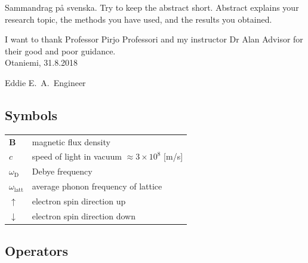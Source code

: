 \documentclass[english, 12pt, a4paper, elec, utf8, a-1b, online]{aaltothesis}
\begin{document}
\newpage

%
\begin{abstractpage}[swedish]
 Sammandrag p\aa{} svenska.
 Try to keep the abstract short. Abstract explains your research topic, 
 the methods you have used, and the results you obtained.  
\end{abstractpage}

I want to thank Professor Pirjo Professori and my instructor Dr Alan Advisor for 
their good and poor guidance.\\

\vspace{5cm}
Otaniemi, 31.8.2018

\vspace{5mm}
{\hfill Eddie E.\ A.\ Engineer \hspace{1cm}}

\newpage


\thesistableofcontents



\subsection*{Symbols}

\begin{tabular}{ll}
$\mathbf{B}$  & magnetic flux density  \\
$c$              & speed of light in vacuum $\approx 3\times10^8$ [m/s]\\
$\omega_{\mathrm{D}}$    & Debye frequency \\
$\omega_{\mathrm{latt}}$ & average phonon frequency of lattice \\
$\uparrow$       & electron spin direction up\\
$\downarrow$     & electron spin direction down
\end{tabular}

\subsection*{Operators}
\end{document}
